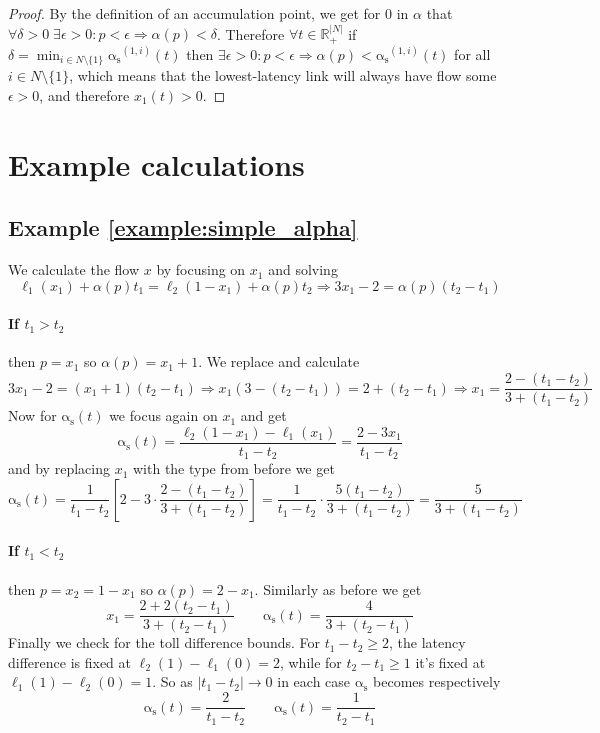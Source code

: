 \documentclass[10pt,a4paper]{book}
\newcommand{\as}{\mathrm{\alpha_s}}
\newcommand{\R}{\mathbb{R}}
\theoremstyle{definition}
\theoremstyle{comment}
\begin{document}
\begin{proof}
	By the definition of an accumulation point, we get for $0$ in $\alpha$ that $\forall \delta > 0 \; \exists \epsilon > 0: p < \epsilon \Rightarrow \alpha(p) < \delta$.
	Therefore $\forall t \in \R_+^{|N|}$ if $\delta = \min_{i \in N \setminus \{1\}}\as^{(1, i)}(t)$ then $\exists \epsilon > 0: p < \epsilon \Rightarrow \alpha(p) < \as^{(1, i)}(t)$ for all $i \in N \setminus \{1\}$, which means that the lowest-latency link will always have flow some $\epsilon > 0$, and therefore $x_1(t) > 0$.
\end{proof}

\section*{Example calculations}

\subsection*{Example \ref{example:simple_alpha}}

We calculate the flow $x$ by focusing on $x_1$ and solving
\[
	\ell_1(x_1) + \alpha(p)t_1 = \ell_2(1 - x_1) + \alpha(p) t_2 \Rightarrow 3 x_1 - 2 = \alpha(p) (t_2 - t_1)
\]

\paragraph{If $t_1 > t_2$} then $p = x_1$ so $\alpha(p) = x_1 + 1$.
We replace and calculate
\[
	3 x_1 - 2 = (x_1 + 1) (t_2 - t_1) \Rightarrow x_1 (3 - (t_2 - t_1)) = 2 + (t_2 - t_1) \Rightarrow x_1 = \frac{2 - (t_1 - t_2)}{3 + (t_1 - t_2)}
\]
Now for $\as(t)$ we focus again on $x_1$ and get
\[
	\as(t) = \frac{\ell_2(1 - x_1) - \ell_1(x_1)}{t_1 - t_2} = \frac{2 - 3 x_1}{t_1 - t_2}
\]
and by replacing $x_1$ with the type from before we get
\[
	\as(t) = \frac{1}{t_1 - t_2} \left[2 - 3 \cdot \frac{2 - (t_1 - t_2)}{3 + (t_1 - t_2)}\right] = \frac{1}{t_1 - t_2} \cdot \frac{5(t_1 - t_2)}{3 + (t_1 - t_2)} = \frac{5}{3 + (t_1 - t_2)}
\]

\paragraph{If $t_1 < t_2$} then $p = x_2 = 1 - x_1$ so $\alpha(p) = 2 - x_1$.
Similarly as before we get
\[
	x_1 = \frac{2 + 2(t_2 - t_1)}{3 + (t_2 - t_1)} \qquad \as(t) = \frac{4}{3 + (t_2 - t_1)}
\]
Finally we check for the toll difference bounds.
For $t_1 - t_2 \ge 2$, the latency difference is fixed at $\ell_2(1) - \ell_1(0) = 2$, while for $t_2 - t_1 \ge 1$ it's fixed at $\ell_1(1) - \ell_2(0) = 1$.
So as $|t_1 - t_2| \rightarrow 0$ in each case $\as$ becomes respectively
\[
	\as(t) = \frac{2}{t_1 - t_2} \qquad \as(t) = \frac{1}{t_2 - t_1}
\]
\end{document}
